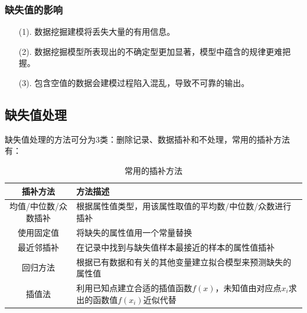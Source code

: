 \documentclass[openany]{progbookcn}
\begin{document}
\subsubsection{缺失值的影响}
\begin{enumerate}
    \item [(1).]数据挖掘建模将丢失大量的有用信息。
    \item [(2).]数据挖掘模型所表现出的不确定型更加显著，模型中蕴含的规律更难把握。
    \item [(3).]包含空值的数据会建模过程陷入混乱，导致不可靠的输出。
\end{enumerate}
\subsection{缺失值处理}
\indent 缺失值处理的方法可分为3类：删除记录、数据插补和不处理，常用的插补方法有：
\begin{table}[h]
\centering
\begin{tabular}{|c|l|}
\hline
{\bf 插补方法} & {\bf 方法描述}\\
\hline
均值/中位数/众数插补 & 根据属性值类型，用该属性取值的平均数/中位数/众数进行插补\\
\hline
使用固定值 & 将缺失的属性值用一个常量替换\\
\hline
最近邻插补 & 在记录中找到与缺失值样本最接近的样本的属性值插补\\
\hline
回归方法 & 根据已有数据和有关的其他变量建立拟合模型来预测缺失的属性值\\
\hline
插值法 & 利用已知点建立合适的插值函数$f(x)$，未知值由对应点$x_i$求出的函数值$f(x_i)$近似代替\\
\hline
\end{tabular}
\caption{常用的插补方法}
\end{table}\\
\end{document}
